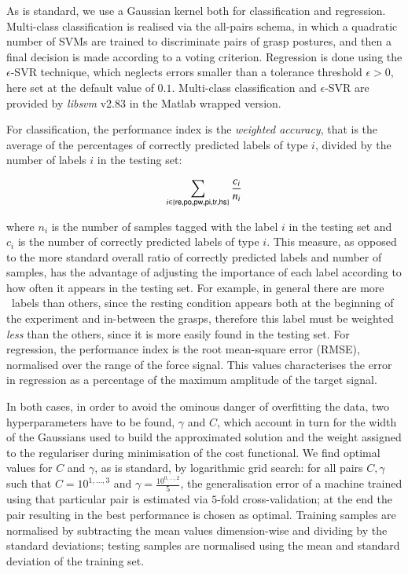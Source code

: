 As is standard, we use a Gaussian kernel both for classification and regression.
Multi-class classification is realised via the all-pairs schema,
in which a quadratic number of SVMs are trained to discriminate pairs of grasp
postures, and then a final decision is made according to a voting criterion.
Regression is done using the $\epsilon$-SVR technique, which neglects errors smaller
than a tolerance threshold $\epsilon>0$, here set at the default value of $0.1$.
Multi-class classification and $\epsilon$-SVR are
provided by \emph{libsvm} v2.83 \cite{ChangL01} in the Matlab wrapped version.

For classification, the performance index is the \emph{weighted accuracy},
that is the average of the percentages of correctly predicted labels of type
$i$, divided by the number of labels $i$ in the testing set:

$$ \sum_{i \in \{\textsf{re},\textsf{po},\textsf{pw},\textsf{pi},\textsf{tr},\textsf{hs}\}}	\frac{c_i}{n_i} $$

\noindent where $n_i$ is the number of samples tagged with the label $i$
in the testing set and $c_i$ is the number of correctly predicted labels of type $i$.
This measure, as opposed to the more standard overall ratio of correctly
predicted labels and number of samples, has the advantage of adjusting the
importance of each label according to how often it appears in the
testing set. For example, in general there are more \re\ labels than others,
since the resting condition appears both at the beginning
of the experiment and in-between the grasps, therefore this label must be
weighted \emph{less} than the others, since it is more easily found in the testing
set. For regression, the performance index is the root mean-square error (RMSE),
normalised over the range of the force signal. This values characterises
the error in regression as a percentage of the maximum amplitude of the target
signal.

In both cases, in order to avoid the ominous danger of overfitting the data,
two hyperparameters have to be found, $\gamma$ and $C$,
which account in turn for the width of the Gaussians used to build the
approximated solution and the weight assigned to the regulariser during minimisation of
the cost functional.
We find optimal values for $C$ and $\gamma$, as is standard, by logarithmic grid search:
for all pairs $C,\gamma$ such that $C=10^{1,\ldots,3}$ and $\gamma=\frac{10^{0,\ldots,2}}{5}$,
the generalisation error of a machine trained using that particular pair is estimated
via $5$-fold cross-validation; at the end the pair resulting in the best performance is
chosen as optimal. Training samples are normalised by subtracting the mean values
dimension-wise and dividing by the standard deviations; testing samples are normalised
using the mean and standard deviation of the training set.


